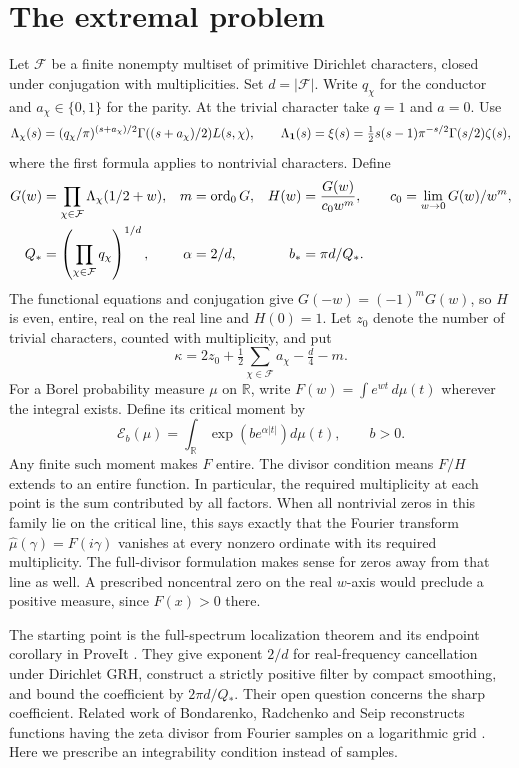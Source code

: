 \documentclass[11pt]{article}
\newcommand{\R}{\mathbb R}\newcommand{\C}{\mathbb C}
\newcommand{\E}{\mathcal E}\newcommand{\F}{\mathcal F}
\begin{document}
\section{The extremal problem}
Let $\F$ be a finite nonempty multiset of primitive Dirichlet characters, closed under conjugation with multiplicities. Set $d=|\F|$. Write $q_\chi$ for the conductor and $a_\chi\in\{0,1\}$ for the parity. At the trivial character take $q=1$ and $a=0$. Use
\[
 \Lambda_\chi(s)=(q_\chi/\pi)^{(s+a_\chi)/2}\Gamma((s+a_\chi)/2)L(s,\chi),
 \qquad \Lambda_{\bf1}(s)=\xi(s)=\tfrac12 s(s-1)\pi^{-s/2}\Gamma(s/2)\zeta(s),
\]
where the first formula applies to nontrivial characters. Define
\begin{align*}
 G(w)&=\prod_{\chi\in\F}\Lambda_\chi(1/2+w),&m&=\ord_0G,&
 H(w)&=\frac{G(w)}{c_0 w^m},\qquad c_0=\lim_{w\to0}G(w)/w^m,\\
 Q_*&=\left(\prod_{\chi\in\F} q_\chi\right)^{1/d},& \alpha&=2/d,& b_*&=\pi d/Q_*.
\end{align*}
The functional equations and conjugation give $G(-w)=(-1)^mG(w)$, so $H$ is even, entire, real on the real line and $H(0)=1$. Let $z_0$ denote the number of trivial characters, counted with multiplicity, and put
\begin{equation}\label{power}
 \kappa=2z_0+\tfrac12\sum_{\chi\in\F}a_\chi-\tfrac d4-m.
\end{equation}
For a Borel probability measure $\mu$ on $\R$, write $F(w)=\int e^{wt}\,d\mu(t)$ wherever the integral exists. Define its critical moment by
\[
 \E_b(\mu)=\int_{\R}\exp\!\left(b e^{\alpha|t|}\right)d\mu(t),\qquad b>0.
\]
Any finite such moment makes $F$ entire. The divisor condition means $F/H$ extends to an entire function. In particular, the required multiplicity at each point is the sum contributed by all factors. When all nontrivial zeros in this family lie on the critical line, this says exactly that the Fourier transform $\widehat\mu(\gamma)=F(i\gamma)$ vanishes at every nonzero ordinate with its required multiplicity. The full-divisor formulation makes sense for zeros away from that line as well. A prescribed noncentral zero on the real $w$-axis would preclude a positive measure, since $F(x)>0$ there.

The starting point is the full-spectrum localization theorem and its endpoint corollary in ProveIt \cite{repo}. They give exponent $2/d$ for real-frequency cancellation under Dirichlet GRH, construct a strictly positive filter by compact smoothing, and bound the coefficient by $2\pi d/Q_*$. Their open question concerns the sharp coefficient. Related work of Bondarenko, Radchenko and Seip reconstructs functions having the zeta divisor from Fourier samples on a logarithmic grid \cite{brs}. Here we prescribe an integrability condition instead of samples.
\end{document}
